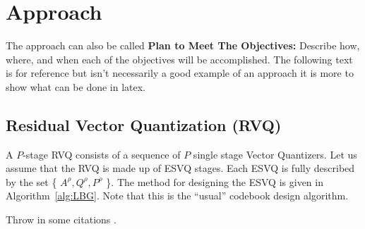 %
%
%
%

\chapter{Approach}
\label{chp:Approach}
The approach can also be called {\bf Plan to Meet The Objectives:} Describe how, where, and when
each of the objectives will be accomplished. The following text is for reference but isn't necessarily a good example of an approach it is more to show what can be done in latex.

\section{Residual Vector Quantization (RVQ)}

A $P$-stage RVQ consists of a sequence of $P$ single stage Vector
Quantizers.  Let us assume that the RVQ is made up of ESVQ stages.
Each ESVQ is fully described by the set \{ $A^{\rho}, Q^{\rho},
P^{\rho}$ \}.  The method for designing the ESVQ is given in
Algorithm~\ref{alg:LBG}.  Note that this is the ``usual'' codebook
design algorithm.%


Throw in some citations \cite{shucker,tbrady,moon,bar1}.



